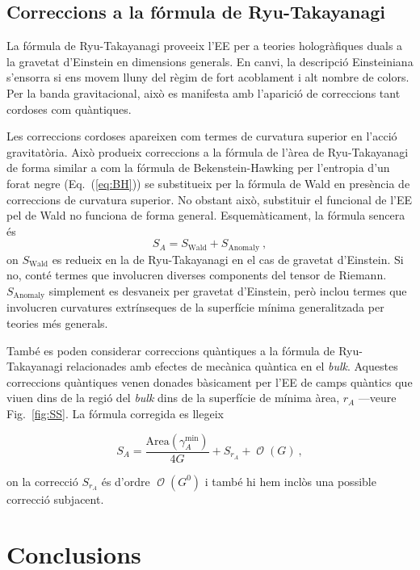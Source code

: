 \documentclass[twocolumn]{revtex4}
\providecommand{\eq}[2]{
    \begin{equation}
        #2
    \label{eq:#1}
    \end{equation}
}
\DeclareMathOperator{\calO}{\mathcal{O}}
\begin{document}
\subsection{Correccions a la fórmula de Ryu-Takayanagi} \label{ss:EE_HO}

La fórmula de Ryu-Takayanagi proveeix l'EE per a teories hologràfiques duals a la gravetat d'Einstein en dimensions generals. En canvi, la descripció Einsteiniana s'ensorra si ens movem lluny del règim de fort acoblament i alt nombre de colors. Per la banda gravitacional, això es manifesta amb l'aparició de correccions tant cordoses com quàntiques.

Les correccions cordoses apareixen com termes de curvatura superior en l'acció gravitatòria. Això produeix correccions a la fórmula de l'àrea de Ryu-Takayanagi de forma similar a com la fórmula de Bekenstein-Hawking per l'entropia d'un forat negre (Eq.~(\ref{eq:BH})) se substitueix per la fórmula de Wald \cite{iyer_properties_1994} en presència de correccions de curvatura superior. No obstant això, substituir el funcional de l'EE pel de Wald no funciona de forma general. Esquemàticament, la fórmula sencera és \cite{dong_holographic_2014}
\begin{equation}\label{hee}
S_A=S_{\text{Wald}}+ S_{\text{Anomaly}} \ ,
\end{equation}
on $S_{\text{Wald}}$ es redueix en la de Ryu-Takayanagi en el cas de gravetat d'Einstein. Si no, conté termes que involucren diverses components del tensor de Riemann. $S_{\text{Anomaly}}$ simplement es desvaneix per gravetat d'Einstein, però inclou termes que involucren curvatures extrínseques de la superfície mínima generalitzada per teories més generals.

També es poden considerar correccions quàntiques a la fórmula de Ryu-Takayanagi relacionades amb efectes de mecànica quàntica en el \emph{bulk}. Aquestes correccions quàntiques venen donades bàsicament per l'EE de camps quàntics que viuen dins de la regió del \emph{bulk} dins de la superfície de mínima àrea, $r_A$ ---veure Fig.~\ref{fig:SS}. La fórmula corregida es llegeix \cite{faulkner_quantum_2013}
\eq{EEquantum}{
S_A = \frac{\text{Area} (\gamma_A^\text{min})}{4 G} + S_{r_A} + \calO(G) \ ,
}
on la correcció $S_{r_A}$ és d'ordre $\calO(G^0)$ i també hi hem inclòs una possible correcció subjacent.


\vspace{-0.4cm}
\section{Conclusions} \label{s:Conclusions}
\end{document}
